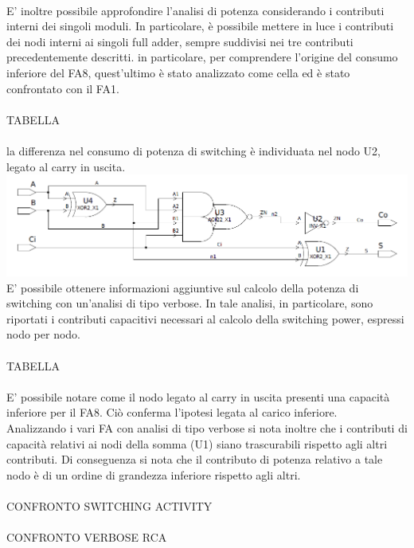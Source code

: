 \documentclass[11pt,  english, makeidx, a4paper, titlepage, oneside]{book}
\begin{document}
\\
E' inoltre possibile approfondire l'analisi di potenza considerando i contributi interni dei singoli moduli. In particolare, è possibile mettere in luce i contributi dei nodi interni ai singoli full adder, sempre suddivisi nei tre contributi precedentemente descritti.
in particolare, per comprendere l'origine del consumo inferiore del FA8, quest'ultimo è stato analizzato come cella ed è stato confrontato con il FA1.
\\\\
TABELLA
\\\\
la differenza nel consumo di potenza di switching è individuata nel nodo U2, legato al carry in uscita.
\\
\includegraphics[width=15cm]{./img/Lab_1/Es_3/Full_adder.png}
\\
E' possibile ottenere informazioni aggiuntive sul calcolo della potenza di switching con un'analisi di tipo verbose. In tale analisi, in particolare, sono riportati i contributi capacitivi necessari al calcolo della switching power, espressi nodo per nodo.
\\\\
TABELLA
\\\\
E' possibile notare come il nodo legato al carry in uscita presenti una capacità inferiore per il FA8. Ciò conferma l'ipotesi legata al carico inferiore.
\\
Analizzando i vari FA con analisi di tipo verbose si nota inoltre che i contributi di capacità relativi ai nodi della somma (U1) siano trascurabili rispetto agli altri contributi.
Di conseguenza si nota che il contributo di potenza relativo a tale nodo è di un ordine di grandezza inferiore rispetto agli altri.
\\\\
CONFRONTO SWITCHING ACTIVITY
\\\\
CONFRONTO VERBOSE RCA
\\\\
\newpage
\end{document}
